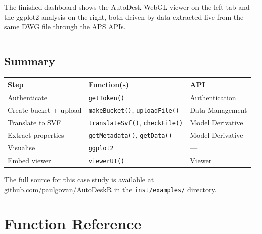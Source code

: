 \documentclass[
  11pt,
  letterpaper,
  DIV=11,
  numbers=noendperiod]{scrreprt}
\begin{document}
The finished dashboard shows the AutoDesk WebGL viewer on the left tab
and the ggplot2 analysis on the right, both driven by data extracted
live from the same DWG file through the APS APIs.

\begin{center}\rule{0.5\linewidth}{0.5pt}\end{center}

\section{Summary}\label{summary}

\begin{longtable}[]{@{}
  >{\raggedright\arraybackslash}p{}
  >{\raggedright\arraybackslash}p{}
  >{\raggedright\arraybackslash}p{}@{}}
\toprule\noalign{}
\begin{minipage}[b]{\linewidth}\raggedright
Step
\end{minipage} & \begin{minipage}[b]{\linewidth}\raggedright
Function(s)
\end{minipage} & \begin{minipage}[b]{\linewidth}\raggedright
API
\end{minipage} \\
\midrule\noalign{}
\endhead
\bottomrule\noalign{}
\endlastfoot
Authenticate & \texttt{getToken()} & Authentication \\
Create bucket + upload & \texttt{makeBucket()}, \texttt{uploadFile()} &
Data Management \\
Translate to SVF & \texttt{translateSvf()}, \texttt{checkFile()} & Model
Derivative \\
Extract properties & \texttt{getMetadata()}, \texttt{getData()} & Model
Derivative \\
Visualise & \texttt{ggplot2} & --- \\
Embed viewer & \texttt{viewerUI()} & Viewer \\
\end{longtable}

The full source for this case study is available at
\href{https://github.com/paulgovan/AutoDeskR}{github.com/paulgovan/AutoDeskR}
in the \texttt{inst/examples/} directory.

\chapter{Function Reference}\label{function-reference}
\end{document}
